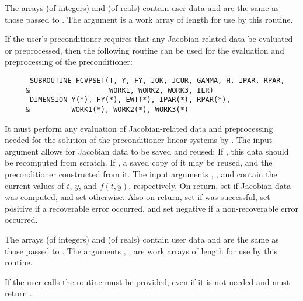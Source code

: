 \begin{Steps}
  The arrays  (of integers) and  (of reals) contain user data
  and are the same as those passed to .
  The argument  is a work array of length  for use by this
  routine.

  If the user's preconditioner requires that any Jacobian related data be evaluated
  or preprocessed, then the following routine can be used for the evaluation and 
  preprocessing of the preconditioner:
\begin{verbatim}
      SUBROUTINE FCVPSET(T, Y, FY, JOK, JCUR, GAMMA, H, IPAR, RPAR,
     &                   WORK1, WORK2, WORK3, IER)
      DIMENSION Y(*), FY(*), EWT(*), IPAR(*), RPAR(*), 
     &          WORK1(*), WORK2(*), WORK3(*) 
\end{verbatim}
  It must perform any evaluation of Jacobian-related data and preprocessing needed
  for the solution of the preconditioner linear systems by .
  The input argument  allows for Jacobian data to be saved and reused:
  If , this data should be recomputed from scratch. If ,
  a saved copy of it may be reused, and the preconditioner constructed from it.
  The input arguments , , and  contain the current
  values of $t$, $y$, and $f(t,y)$, respectively.
  On return, set  if Jacobian data was computed, and set
   otherwise.
  Also on return, set  if  was successful, set 
  positive if a recoverable error occurred, and set  negative if a 
  non-recoverable error occurred.
  
  The arrays  (of integers) and  (of reals) contain user data
  and are the same as those passed to .
  The arguments , ,  are work arrays of length 
   for use by this routine.

  {\warn}If the user calls  the routine  must
  be provided, even if it is not needed and must return .


\end{Steps}
